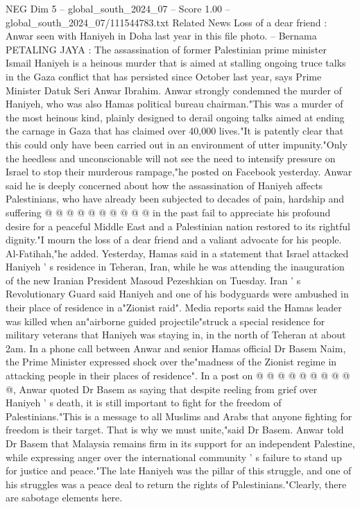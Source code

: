 \begin{textsample}{NEG Dim 5 – global\_south\_2024\_07 – Score 1.00 – global\_south\_2024\_07/111544783.txt}  \label{ex:f5_neg_296}
Related News Loss of a dear friend : Anwar seen with Haniyeh in Doha last year in this file photo. -- Bernama PETALING JAYA : The assassination of former Palestinian prime minister Ismail Haniyeh is a heinous murder that is aimed at stalling ongoing truce talks in the Gaza conflict that has persisted since October last year, says Prime Minister Datuk Seri Anwar Ibrahim.
Anwar strongly condemned the murder of Haniyeh, who was also Hamas political bureau chairman."This was a murder of the most heinous kind, plainly designed to derail ongoing talks aimed at ending the carnage in Gaza that has claimed over 40,000 lives."It is patently clear that this could only have been carried out in an environment of utter impunity."Only the heedless and unconscionable will not see the need to intensify pressure on Israel to stop their murderous rampage,"he posted on Facebook yesterday.
Anwar said he is deeply concerned about how the assassination of Haniyeh affects Palestinians, who have already been subjected to decades of pain, hardship and suffering @ @ @ @ @ @ @ @ @ @ in the past fail to appreciate his profound desire for a peaceful Middle East and a Palestinian nation restored to its rightful dignity."I mourn the loss of a dear friend and a valiant advocate for his people.
Al-Fatihah,"he added.
Yesterday, Hamas said in a statement that Israel attacked Haniyeh ' s residence in Teheran, Iran, while he was attending the inauguration of the new Iranian President Masoud Pezeshkian on Tuesday.
Iran ' s Revolutionary Guard said Haniyeh and one of his bodyguards were ambushed in their place of residence in a"Zionist raid".
Media reports said the Hamas leader was killed when an"airborne guided projectile"struck a special residence for military veterans that Haniyeh was staying in, in the north of Teheran at about 2am.
In a phone call between Anwar and senior Hamas official Dr Basem Naim, the Prime Minister expressed shock over the"madness of the Zionist regime in attacking people in their places of residence".
In a post on @ @ @ @ @ @ @ @ @ @, Anwar quoted Dr Basem as saying that despite reeling from grief over Haniyeh ' s death, it is still important to fight for the freedom of Palestinians."This is a message to all Muslims and Arabs that anyone fighting for freedom is their target.
That is why we must unite,"said Dr Basem.
Anwar told Dr Basem that Malaysia remains firm in its support for an independent Palestine, while expressing anger over the international community ' s failure to stand up for justice and peace."The late Haniyeh was the pillar of this struggle, and one of his struggles was a peace deal to return the rights of Palestinians."Clearly, there are sabotage elements here.

\end{textsample}
